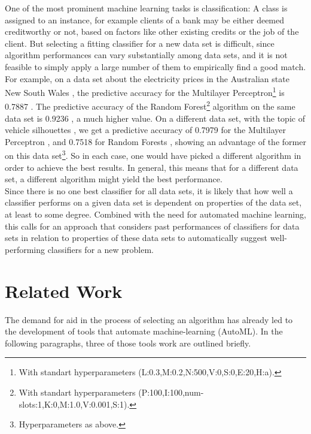 \documentclass[12pt]{scrartcl}
\begin{document}
One of the most prominent machine learning tasks is classification: A class is assigned to an instance, for example clients of a bank may be either deemed creditworthy or not, based on factors like other existing credits or the job of the client. But selecting a fitting classifier for a new data set is difficult, since algorithm performances can vary substantially among data sets, and it is not feasible to simply apply a large number of them to empirically find a good match. For example, on a data set about the electricity prices in the Australian state New South Wales \cite{harris1999splice}, the predictive accuracy for the Multilayer Perceptron\footnote{With standart hyperparameters (L:0.3,M:0.2,N:500,V:0,S:0,E:20,H:a).} is 0.7887 \cite{cachada2017run3}. The predictive accuracy of the Random Forest\footnote{With standart hyperparameters (P:100,I:100,num-slots:1,K:0,M:1.0,V:0.001,S:1).} algorithm on the same data set is 0.9236 \cite{cachada2017run}, a much higher value. On a different data set, with the topic of vehicle silhouettes \cite{siebert1987vehicle}, we get a predictive accuracy of 0.7979 for the Multilayer Perceptron \cite{cachada2017run4}, and 0.7518 for Random Forests \cite{cachada2017run2}, showing an advantage of the former on this data set\footnote{Hyperparameters as above.}. So in each case, one would have picked a different algorithm in order to achieve the best results. In general, this means that for a different data set, a different algorithm might yield the best performance.\\
 
Since there is no one best classifier for all data sets, it is likely that how well a classifier performs on a given data set is dependent on properties of the data set, at least to some degree. Combined with the need for automated machine learning, this calls for an approach that considers past performances of classifiers for data sets in relation to properties of these data sets to automatically suggest well-performing classifiers for a new problem.

\section{Related Work}\label{sec:related_work}
The demand for aid in the process of selecting an algorithm has already led to the development of tools that automate machine-learning (AutoML). In the following paragraphs, three of those tools work are outlined briefly.\\
\end{document}
